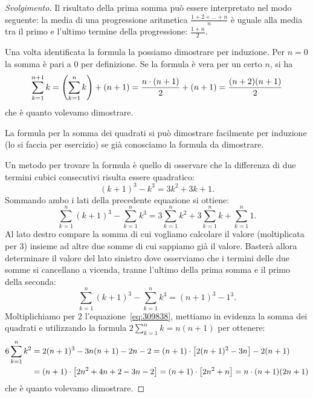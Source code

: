 \begin{proof}[Svolgimento]
Il risultato della prima somma può essere interpretato nel modo seguente:
la media di una progressione aritmetica $\frac{1+2+ \dots + n}{n}$ 
è uguale alla media tra il primo 
e l'ultimo termine della progressione: $\frac{1+n}{2}$.

Una volta identificata la formula la possiamo dimostrare per induzione.
Per $n=0$ la somma è pari a $0$ per definizione.
Se la formula è vera per un certo $n$, si ha 
\[
  \sum_{k=1}^{n+1} k = {\left( \sum_{k=1}^n k \right)} + (n+1)
   = \frac{n\cdot(n+1)}{2} + (n+1) 
   = \frac{(n+2)(n+1)}{2}
\]
che è quanto volevamo dimostrare.

La formula per la somma dei quadrati si può dimostrare facilmente per 
induzione (lo si faccia per esercizio) se già conosciamo la formula da 
dimostrare.

Un metodo per trovare la formula è quello di osservare che la differenza 
di due termini cubici consecutivi risulta essere quadratico:
\[
(k+1)^3 - k^3 = 3 k^2 + 3k + 1.  
\]
Sommando ambo i lati della precedente equazione si ottiene:
\begin{equation}\label{eq:309838}
\sum_{k=1}^n (k+1)^3 - \sum_{k=1}^n k^3 
= 3\sum_{k=1}^n k^2+3\sum_{k=1}^n k+\sum_{k=1}^n 1.
\end{equation}
Al lato destro compare la somma di cui vogliamo calcolare il valore 
(moltiplicata per $3$)
insieme ad altre due somme di cui sappiamo già il valore. 
Basterà allora determinare il valore del lato sinistro dove 
osserviamo che i termini delle due somme si cancellano 
a vicenda,
tranne l'ultimo della prima somma 
e il primo della seconda: 
\[
  \sum_{k=1}^n(k+1)^3 - \sum_{k=1}^n k^3 = (n+1)^3 - 1^3.
\]
Moltiplichiamo per $2$ l'equazione~\eqref{eq:309838},
mettiamo in evidenza la somma dei quadrati e 
utilizzando la formula $2\sum_{k=1}^n k = n(n+1)$
per ottenere:
\begin{align*}
  6 \sum_{k=1}^n k^2 
  &=  2(n+1)^3 - 3 n(n+1) - 2n - 2
  = (n+1) \cdot {\left[ 2(n+1)^2 - 3n \right]} - 2(n+1)\\
  &= (n+1)\cdot {\left[ 2n^2+4n+2 -3n - 2 \right]}
   = (n+1)\cdot {\left[ 2n^2+n \right]} 
   = n \cdot (n+1)(2n+1)
\end{align*}
che è quanto volevamo dimostrare.
\end{proof}

